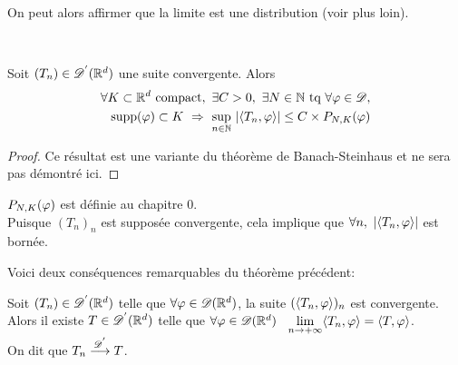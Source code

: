 \documentclass[french,a4paper,10pt]{article}
\begin{document}
            \begin{remark}\label{2.1.2}
                On peut alors affirmer que la limite est une distribution (voir plus loin).
            \end{remark}
    
            \begin{theorem}\label{thm:2.1.3}~

                Soit $(T_n) \in \mathscr{D^{'}}(\mathbb{R}^d)$  une suite convergente. Alors 
                \begin{equation*}
                    \begin{aligned}
                        \forall K \subset \R^d \text{ compact},\ \exists C>0,\ \exists N\in \N \text{ tq } \forall \vphi \in \D, \\ 
                        \text{supp}(\vphi) \subset K \ \Rightarrow \ \sup\limits_{n\in\N}\ \n{\langle T_n,\vphi \rangle} \leq C \times P_{N,K}(\vphi)
                    \end{aligned}
                \end{equation*}
            \end{theorem}
    
            \begin{proof}
                Ce résultat est une variante du théorème de Banach-Steinhaus et ne sera pas démontré ici.
            \end{proof}
    
            \begin{remark}\label{rem:2.1.4}
                $P_{N,K}(\varphi)$ est définie au chapitre 0. \\
                Puisque $(T_n)_n$ est supposée convergente, cela implique que $\forall n, \ \mathopen{}\left|\langle T_n,\varphi \rangle\right|\mathclose{}$ est bornée.
            \end{remark}
    
            Voici deux conséquences remarquables du théorème précédent:
    
            \begin{corollaire}\label{corol:2.1.5}
                 Soit $(T_n) \in \mathscr{D^{'}}(\mathbb{R}^d)$ telle que $\forall \varphi \in \mathscr{D}(\mathbb{R}^d)$, la suite $(\langle T_n,\varphi \rangle)_n$ est convergente. Alors il existe $T \in \mathscr{D^{'}}(\mathbb{R}^d)$ telle que  $\forall \varphi \in \mathscr{D}(\mathbb{R}^d) $ \ $\underset{n \to +\infty}{\lim}\langle T_n,\varphi \rangle = \langle T,\varphi \rangle$. \\
                 On dit que $T_n \stackrel{\mathscr{D^{'}}}{\longrightarrow} T$.
            \end{corollaire}
    
\end{document}
